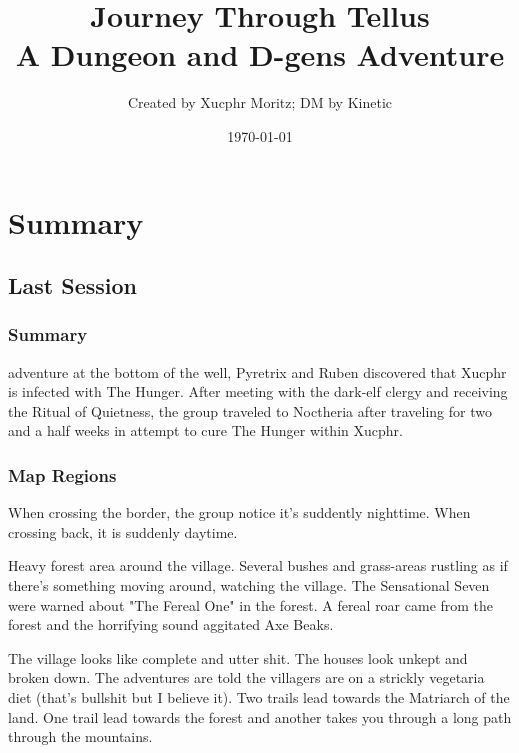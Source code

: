 \documentclass[letterpaper,twocolumn,openany,nodeprecatedcode]{dndbook}
\title{Journey Through Tellus \\
\large A Dungeon and D-gens Adventure}
\author{Created by Xucphr Moritz; DM by Kinetic}
\date{\today}
\begin{document}
\frontmatter

\maketitle

\tableofcontents

\mainmatter%

\part{Summary}


\chapter{Last Session}
\section{Summary}
 adventure at the bottom of the well, Pyretrix and Ruben discovered that Xucphr is infected with The Hunger. After meeting with the dark-elf clergy and receiving the Ritual of Quietness, the group traveled to Noctheria after traveling for two and a half weeks in attempt to cure The Hunger within Xucphr.

\section{Map Regions}


When crossing the border, the group notice it's suddently nighttime. When crossing back, it is suddenly daytime.

	Heavy forest area around the village. Several bushes and grass-areas rustling as if there's something moving around, watching the village. The Sensational Seven were warned about "The Fereal One" in the forest. A fereal roar came from the forest and the horrifying sound aggitated Axe Beaks.
	
The village looks like complete and utter shit. The houses look unkept and broken down. The adventures are told the villagers are on a strickly vegetaria diet (that's bullshit but I believe it). Two trails lead towards the Matriarch of the land. One trail lead towards the forest and another takes you through a long path through the mountains.
\end{document}
